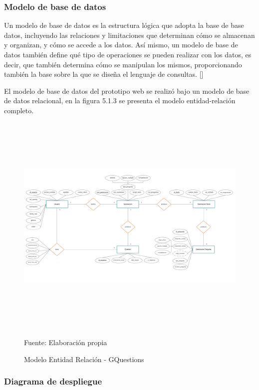 \documentclass[../Main.tex]{subfiles}
\begin{document}
    \subsubsection{Modelo de base de datos}
    \begin{justify}
    Un modelo de base de datos es la estructura lógica que adopta la base de base datos, incluyendo las relaciones y limitaciones que determinan cómo se almacenan y organizan, y cómo se accede a los datos. Así mismo, un modelo de base de datos también define qué tipo de operaciones se pueden realizar con los datos, es decir, que también determina cómo se manipulan los mismos, proporcionando también la base sobre la que se diseña el lenguaje de consultas. [] %
    
    El modelo de base de datos del prototipo web se realizó bajo un modelo de base de datos relacional, en la figura 5.1.3 se presenta el modelo entidad-relación completo.
    \end{justify}
    
    \begin{figure}[H]
	\begin{Center}
		\includegraphics[width=6.4in,height=4.3in]{Images/Diagrama-ER-DBMS.png}
	    \caption{Modelo Entidad Relación - GQuestions}
	    Fuente: Elaboración propia
        \label{fig:section}
	\end{Center}
    \end{figure}
    
    \newpage
    \subsubsection{Diagrama de despliegue}
    
\end{document}
